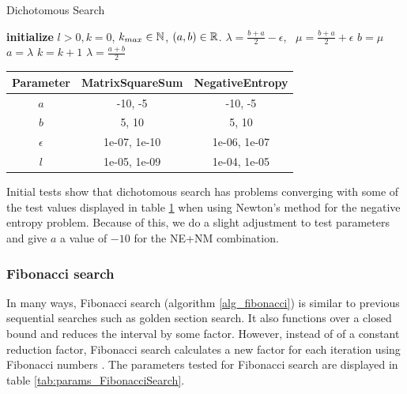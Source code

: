 \documentclass[english, 12pt, a4paper, sci, utf8, a-1b, online, table]{aaltothesis}
\newcommand{\R}{\ensuremath\mathbb{R}}
\newcommand{\N}{\ensuremath\mathbb{N}}
\begin{document}
\begin{algorithm}[H]
\caption{Dichotomous Search}
\label{alg_dichotomous}
\begin{algorithmic}[1]
\STATE \textbf{initialize} $l > 0, k = 0$, $k_{max} \in \N$, $(a, b) \in \R$.
    \STATE $\lambda = \frac{b + a}{2} - \epsilon$, \ $\mu = \frac{b + a}{2} + \epsilon$
    \IF{$\theta(\lambda) < \theta(\mu)$}
        \STATE $b = \mu$
    \ELSE
        \STATE $a = \lambda$
    \ENDIF
    \STATE $k = k + 1$
\ENDWHILE
\RETURN $\lambda = \frac{a + b}{2}$
\end{algorithmic}
\end{algorithm}

\begin{table}[H]
\label{tab:params_DichotomousSearch}
\centering
{}
\begin{tabular}{|c|c|c|}
\hline
\rowcolor{gray!25}
Parameter & MatrixSquareSum & NegativeEntropy \\
\hline
$a$ & -10, -5 & -10, -5 \\
$b$ & 5, 10 & 5, 10 \\
$\epsilon$ & 1e-07, 1e-10 & 1e-06, 1e-07 \\
$l$ & 1e-05, 1e-09 & 1e-04, 1e-05 \\
\hline
\end{tabular}
\end{table}

Initial tests show that dichotomous search has problems converging with some of the test values displayed in table \ref{tab:params_DichotomousSearch} when using Newton's method for the negative entropy problem. Because of this, we do a slight adjustment to test parameters and give $a$ a value of $-10$ for the NE+NM combination.


\subsubsection{Fibonacci search}

In many ways, Fibonacci search (algorithm \ref{alg_fibonacci}) is similar to previous sequential searches such as golden section search. It also functions over a closed bound and reduces the interval by some factor. However, instead of of a constant reduction factor, Fibonacci search calculates a new factor for each iteration using Fibonacci numbers \cite{book:nonlinear_programming}. The parameters tested for Fibonacci search are displayed in table \ref{tab:params_FibonacciSearch}.
\end{document}
